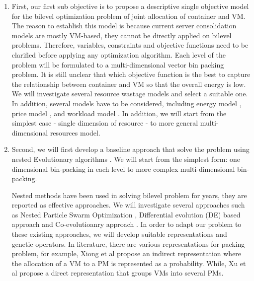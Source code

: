\begin{enumerate}
	\item First, our first sub objective is to propose a descriptive single objective model for the bilevel optimization problem of joint allocation of container and VM. The reason to establish this model is because current server consolidation models are mostly VM-based, they cannot be directly applied on bilevel problems. Therefore, variables, constraints and objective functions need to be clarified before applying any optimization algorithm.
	Each level of the problem will be formulated to a multi-dimensional vector bin packing problem. It is still unclear that which objective function is the best to capture the relationship between container and VM so that the overall energy is low. We will investigate several resource wastage models \cite{Ferdaus:2014ep, Xu:2010vh, Gao:2013gg} and select a suitable one. In addition, several models have to be considered, including energy model \cite{Dayarathna:2016ua}, price model \cite{AlRoomi:2013te}, and workload model \cite{Magalhaes:2015ep}.
	In addition, we will start from the simplest case - single dimension of resource - to more general multi-dimensional resources model.

	\item Second, we will first develop a baseline approach that solve the problem using nested Evolutionary algorithms \cite{Sinha:2017et}. We will start from the simplest form: one dimensional bin-packing in each level to more complex multi-dimensional bin-packing.

	Nested methods have been used in solving bilevel problem for years, they are reported as effective approaches. We will investigate several approaches such as Nested Particle Swarm Optimization \cite{Li:2006br}, Differential evolution (DE) based approach \cite{Angelo:2013ee, Zhu:2006in} and Co-evolutioanry approach \cite{Legillon:2012dd}. In order to adapt our problem to these existing approaches, we will develop suitable representations and genetic operators. In literature, there are various representations for packing problem, for example, Xiong et al \cite{Xiong:2014jq} propose an indirect representation where the allocation of a VM to a PM is represented as a probability. While, Xu et al \cite{Xu:2010vh} propose a direct representation that groups VMs into several PMs.

\end{enumerate}

